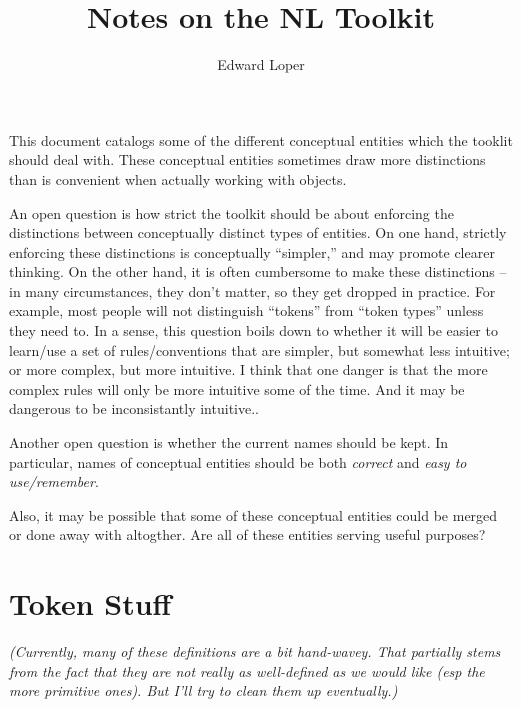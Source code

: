 \documentclass{article}
\begin{document}
\title{Notes on the NL Toolkit}
\author{Edward Loper}
\maketitle

This document catalogs some of the different conceptual entities which
the tooklit should deal with.  These conceptual entities sometimes
draw more distinctions than is convenient when actually working with
objects.  

An open question is how strict the toolkit should be about enforcing
the distinctions between conceptually distinct types of entities.  On
one hand, strictly enforcing these distinctions is conceptually
``simpler,'' and may promote clearer thinking.  On the other hand, it
is often cumbersome to make these distinctions -- in many
circumstances, they don't matter, so they get dropped in practice.
For example, most people will not distinguish ``tokens'' from ``token
types'' unless they need to.  In a sense, this question boils down to
whether it will be easier to learn/use a set of rules/conventions that
are simpler, but somewhat less intuitive; or more complex, but more
intuitive.  I think that one danger is that the more complex rules
will only be more intuitive some of the time.  And it may be dangerous
to be inconsistantly intuitive..

Another open question is whether the current names should be kept.  In
particular, names of conceptual entities should be both \emph{correct}
and \emph{easy to use/remember}.

Also, it may be possible that some of these conceptual entities could
be merged or done away with altogther.  Are all of these entities
serving useful purposes?



\section{Token Stuff}

{\it (Currently, many of these definitions
are a bit hand-wavey.  That partially stems from the fact that they
are not really as well-defined as we would like (esp the more
primitive ones).  But I'll try to clean them up eventually.)}
\end{document}
